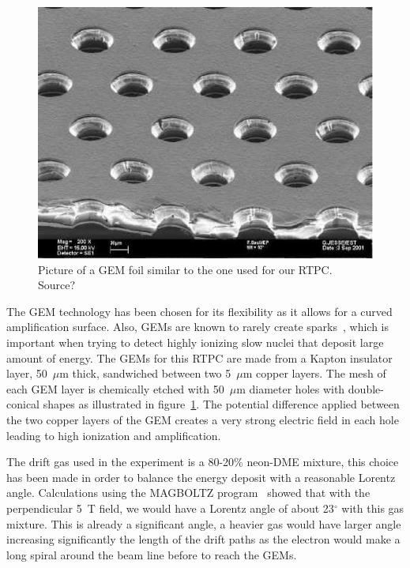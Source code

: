 \documentclass[twocolumn,showpacs,superscriptaddress,groupedaddress]{revtex4}
\begin{document}
\begin{figure}[tbp]
\centering
\includegraphics[scale=0.70]{fig/GEM_photo.jpg}
\caption{Picture of a GEM foil similar to the one used for our RTPC. {\color{red} Source?}} 
\label{fig:GEMs}
\end{figure}

The GEM technology has been chosen for its flexibility as it
allows for a curved amplification surface. Also, GEMs are known to rarely create 
sparks~\cite{GEM_ref}, which is important when trying to detect 
highly ionizing slow nuclei that deposit large amount of energy. The GEMs for 
this RTPC are made from a Kapton insulator layer, 50~$\mu$m 
thick, sandwiched between two 5~$\mu$m copper layers. The mesh of each GEM 
layer is chemically etched with 50~$\mu$m diameter holes with double-conical 
shapes as illustrated in figure~\ref{fig:GEMs}. The potential difference 
applied between the two copper layers of the GEM creates a very strong 
electric field in each hole leading to high ionization and amplification. 

The drift gas used in the experiment is a 80-20\% neon-DME mixture, this choice 
has been made in order to balance the energy deposit with a reasonable
Lorentz angle. Calculations using the MAGBOLTZ program~\cite{MAGBOLTZ} 
showed that with the perpendicular 5~T field, we would have a Lorentz angle of 
about 23$^\circ$ with this gas mixture. This is already a significant angle,
a heavier gas would have larger angle increasing significantly
the length of the drift paths as the electron would 
make a long spiral around the beam line before to reach the GEMs. 
\end{document}
